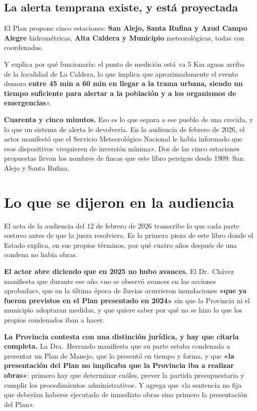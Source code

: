 \subsection*{La alerta temprana existe, y está proyectada}

El Plan propone cinco estaciones: \textbf{San Alejo, Santa Rufina y Azud Campo Alegre}
hidrométricas, \textbf{Alta Caldera y Municipio} meteorológicas, todas con coordenadas.

Y explica por qué funcionaría: el punto de medición está «a 5 Km aguas arriba de la localidad
de La Caldera, lo que implica que aproximadamente el evento demora \textbf{entre 45 min a 60
min en llegar a la trama urbana, siendo un tiempo suficiente para alertar a la población y a
los organismos de emergencias}».

\textbf{Cuarenta y cinco minutos.} Eso es lo que separa a ese pueblo de una crecida, y lo que
un sistema de alerta le devolvería. En la audiencia de febrero de 2026, el actor manifestó
que el Servicio Meteorológico Nacional le había informado que esos dispositivos «requieren de
inversión mínima». Dos de las cinco estaciones propuestas llevan los nombres de fincas que
este libro persigue desde 1909: San Alejo y Santa Rufina.

\section{Lo que se dijeron en la audiencia}

El acta de la audiencia del 12 de febrero de 2026 transcribe lo que cada parte sostuvo antes
de que la jueza resolviera. Es la primera pieza de este libro donde el Estado explica, en sus
propios términos, por qué cuatro años después de una condena no había obras.

\textbf{El actor abre diciendo que en 2025 no hubo avances.} El Dr.\ Chávez manifiesta que
durante ese año «no se observó avances en las acciones aprobadas», que en la última época de
lluvias ocurrieron inundaciones \textbf{«que ya fueron previstos en el Plan presentado en
2024»} sin que la Provincia ni el municipio adoptaran medidas, y que quiere saber por qué no
se hizo lo que los propios condenados iban a hacer.

\textbf{La Provincia contesta con una distinción jurídica, y hay que citarla completa.} La
Dra.\ Herrando manifiesta que su parte estaba condenada a presentar un Plan de Manejo, que lo
presentó en tiempo y forma, y que \textbf{«la presentación del Plan no implicaba que la
Provincia iba a realizar obras»}: primero hay que determinar cuáles, prever la partida
presupuestaria y cumplir los procedimientos administrativos. Y agrega que «la sentencia no
fija que deberían haberse ejecutado de inmediato obras sino primero la presentación del
Plan».

